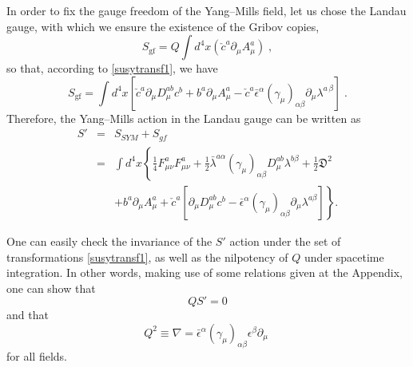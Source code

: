 \begin{appendix}
\noindent In order to fix the gauge freedom of the Yang--Mills field, let us chose the  Landau gauge, with which we ensure the existence of the Gribov copies,
\begin{equation}
S_\text{gf} = Q\int d^{4}x (\check{c}^{a}\partial_{\mu}A^{a}_{\mu})\;,
\end{equation}
so that, according to \eqref{susytransf1}, we have
\begin{equation}
S_\text{gf} = \int d^{4}x \left[ \check{c}^{a}\partial_{\mu}D^{ab}_{\mu}c^{b} + b^{a}\partial_{\mu}A^{a}_{\mu}   - \check{c}^{a}\bar{\epsilon}^{\alpha}(\gamma_{\mu})_{\alpha\beta}\partial_{\mu}\lambda^{a\,\beta} \right]\;.
\end{equation}
Therefore, the Yang--Mills action in the Landau gauge can be written as
\begin{eqnarray}
\label{act2}
S' &=& S_{SYM} + S_{gf} \nonumber \\
&=&
\int d^{4}x \left\{\frac{1}{4}F^{a}_{\mu \nu}F^{a}_{\mu\nu} 
+ \frac{1}{2}\bar{\lambda}^{a\alpha}(\gamma_{\mu})_{\alpha \beta}D^{ab}_{\mu} \lambda^{b\beta}
+ \frac{1}{2}\mathfrak{D}^{2} \right. \nonumber \\
&&
\left.
+ b^{a}\partial_{\mu}A^{a}_{\mu}
+\check{c}^{a}\left[\partial_{\mu}D^{ab}_{\mu}c^{b} - \bar{\epsilon}^{\alpha}(\gamma_{\mu})_{\alpha \beta}\partial_{\mu}\lambda^{a\beta} \right]\right\}.
\label{gfaction1}
\end{eqnarray}

\noindent One can easily check the invariance of the $S'$ action under the set of transformations \eqref{susytransf1}, as well as the nilpotency of $Q$ under spacetime integration. In other words, making use of some relations given at the Appendix, one can show that 
\begin{equation}
QS'=0
\end{equation}
 and that
\begin{equation}
 Q^{2} \equiv\nabla=\bar{\epsilon}^{\alpha}(\gamma_{\mu})_{\alpha\beta}\epsilon^{\beta} \partial_{\mu}\;
\end{equation}
for all fields.


\end{appendix}
